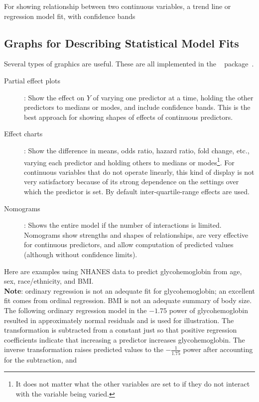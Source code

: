\item For showing relationship between two continuous variables, a
  trend line or regression model fit, with confidence bands
\ei

\subsection{Graphs for Describing Statistical Model Fits}
Several types of graphics are useful.  These are all implemented in
the \R\  package~\cite{rrms}.
\begin{description}
  \item[Partial effect plots]: Show the effect on $Y$ of varying one
    predictor at a time, holding the other predictors to medians or
    modes, and include confidence bands.  This is the best approach
    for showing shapes of effects of continuous predictors.
  \item[Effect charts]: Show the difference in means, odds ratio,
    hazard ratio, fold change, etc., varying each predictor and
    holding others to medians or modes\footnote{It does not matter
      what the other variables are set to if they do not interact with
      the variable being varied.}.  For continuous variables that do
    not operate linearly, this kind of display is not very
    satisfactory because of its strong dependence on the settings over
    which the predictor is set.  By default inter-quartile-range
    effects are used.
  \item[Nomograms]: Shows the entire model if the number of
    interactions is limited.  Nomograms show strengths and shapes of
    relationships, are very effective for continuous predictors, and
    allow computation of predicted values (although without confidence limits).
\end{description}
Here are examples using NHANES data to predict glycohemoglobin from
age, sex, race/ethnicity, and BMI.\\
\textbf{Note}: ordinary regression is not an adequate fit for glycohemoglobin;
an excellent fit comes from ordinal regression.  BMI is not an
adequate summary of body size.  The following
ordinary regression model in the $-1.75$ power of glycohemoglobin
resulted in approximately normal residuals and is used for
illustration.  The transformation is subtracted from a constant just
so that positive regression coefficients indicate that increasing a
predictor increases glycohemoglobin.  The inverse transformation
raises predicted values to 
the $-\frac{1}{1.75}$ power after accounting for the subtraction, and
